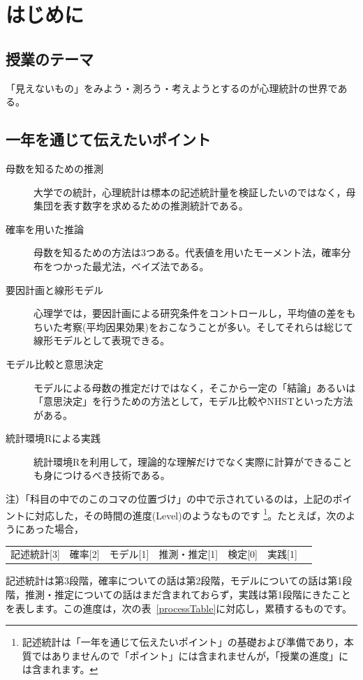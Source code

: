 \section*{はじめに}
\subsection*{授業のテーマ}

「見えないもの」をみよう・測ろう・考えようとするのが心理統計の世界である。

\subsection*{一年を通じて伝えたいポイント}
\begin{description}
	\item[母数を知るための推測] 大学での統計，心理統計は標本の記述統計量を検証したいのではなく，母集団を表す数字を求めるための推測統計である。
	\item[確率を用いた推論] 母数を知るための方法は3つある。代表値を用いたモーメント法，確率分布をつかった最尤法，ベイズ法である。
	\item[要因計画と線形モデル] 心理学では，要因計画による研究条件をコントロールし，平均値の差をもちいた考察(平均因果効果)をおこなうことが多い。そしてそれらは総じて線形モデルとして表現できる。
	\item[モデル比較と意思決定] モデルによる母数の推定だけではなく，そこから一定の「結論」あるいは「意思決定」を行うための方法として，モデル比較やNHSTといった方法がある。
	\item[統計環境Rによる実践] 統計環境Rを利用して，理論的な理解だけでなく実際に計算ができることも身につけるべき技術である。
\end{description}

注）「科目の中でのこのコマの位置づけ」の中で示されているのは，上記のポイントに対応した，その時間の進度(Level)のようなものです
\footnote{記述統計は「一年を通じて伝えたいポイント」の基礎および準備であり，本質ではありませんので「ポイント」には含まれませんが，「授業の進度」には含まれます。}。たとえば，次のようにあった場合，
\begin{tcolorbox}
	\begin{tabular}[t]{ccccccc}
		記述統計[3] & 確率[2] & モデル[1] & 推測・推定[1] & 検定[0] & 実践[1]
	\end{tabular}
\end{tcolorbox}
記述統計は第3段階，確率についての話は第2段階，モデルについての話は第1段階，推測・推定についての話はまだ含まれておらず，実践は第1段階にきたことを表します。この進度は，次の表~\ref{processTable}に対応し，累積するものです。

